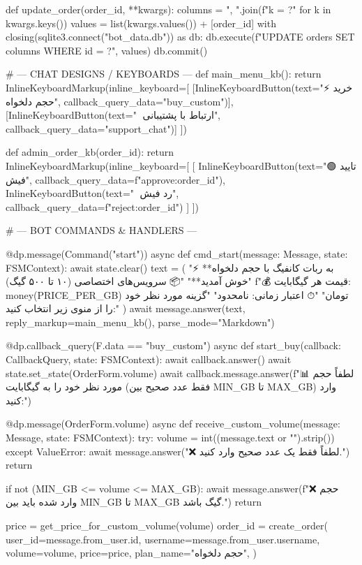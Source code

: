 def update_order(order_id, **kwargs):
    columns = ", ".join(f"{k} = ?" for k in kwargs.keys())
    values = list(kwargs.values()) + [order_id]
    with closing(sqlite3.connect("bot_data.db")) as db:
        db.execute(f"UPDATE orders SET {columns} WHERE id = ?", values)
        db.commit()

# --- CHAT DESIGNS / KEYBOARDS ---
def main_menu_kb():
    return InlineKeyboardMarkup(inline_keyboard=[
        [InlineKeyboardButton(text="⚡️ خرید حجم دلخواه", callback_query_data="buy_custom")],
        [InlineKeyboardButton(text="💬 ارتباط با پشتیبانی", callback_query_data="support_chat")]
    ])

def admin_order_kb(order_id):
    return InlineKeyboardMarkup(inline_keyboard=[
        [
            InlineKeyboardButton(text="🟢 تایید فیش", callback_query_data=f"approve:{order_id}"),
            InlineKeyboardButton(text="🔴 رد فیش", callback_query_data=f"reject:{order_id}")
        ]
    ])

# --- BOT COMMANDS & HANDLERS ---

@dp.message(Command("start"))
async def cmd_start(message: Message, state: FSMContext):
    await state.clear()
    text = (
        "⚡️ **به ربات کانفیگ با حجم دلخواه خوش آمدید**\n\n"
        "📦 سرویس‌های اختصاصی (۱۰ تا ۵۰۰ گیگ)\n"
        f"💰 قیمت هر گیگابایت: {money(PRICE_PER_GB)} تومان\n"
        "⏱ اعتبار زمانی: نامحدود\n\n"
        "گزینه مورد نظر خود را از منوی زیر انتخاب کنید:"
    )
    await message.answer(text, reply_markup=main_menu_kb(), parse_mode="Markdown")

@dp.callback_query(F.data == "buy_custom")
async def start_buy(callback: CallbackQuery, state: FSMContext):
    await callback.answer()
    await state.set_state(OrderForm.volume)
    await callback.message.answer(f"📊 لطفاً حجم مورد نظر خود را به گیگابایت (فقط عدد صحیح بین {MIN_GB} تا {MAX_GB}) وارد کنید:")

@dp.message(OrderForm.volume)
async def receive_custom_volume(message: Message, state: FSMContext):
    try:
        volume = int((message.text or "").strip())
    except ValueError:
        await message.answer("❌ لطفاً فقط یک عدد صحیح وارد کنید.")
        return

    if not (MIN_GB <= volume <= MAX_GB):
        await message.answer(f"❌ حجم وارد شده باید بین {MIN_GB} تا {MAX_GB} گیگ باشد.")
        return

    price = get_price_for_custom_volume(volume)
    order_id = create_order(
        user_id=message.from_user.id,
        username=message.from_user.username,
        volume=volume,
        price=price,
        plan_name="حجم دلخواه",
    )

